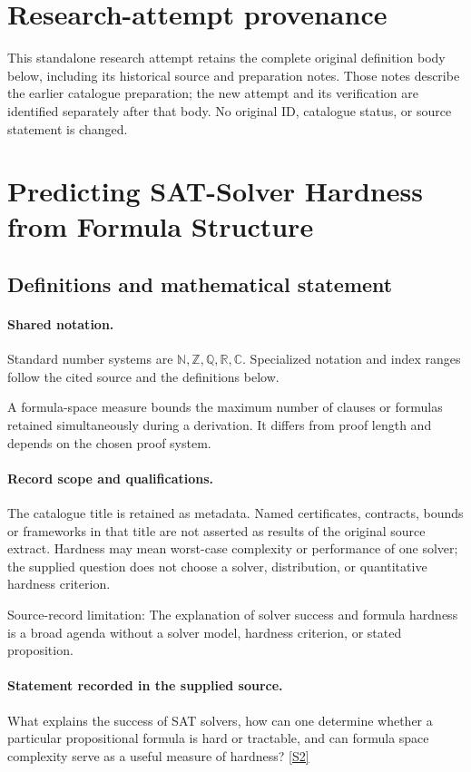 \documentclass[11pt]{article}
\begin{document}
\section*{Research-attempt provenance}
This standalone research attempt retains the complete original definition body below,
including its historical source and preparation notes. Those notes describe the
earlier catalogue preparation; the new attempt and its verification are identified
separately after that body. No original ID, catalogue status, or source statement is changed.

\section{Predicting SAT-Solver Hardness from Formula Structure}\label{statement}

\subsection{Definitions and mathematical statement}

\paragraph{Shared notation.}Standard number systems are $\mathbb N,\mathbb Z,\mathbb Q,\mathbb R,\mathbb C$. Specialized notation and index ranges follow the cited source and the definitions below.


A formula-space measure bounds the maximum number of clauses or formulas retained simultaneously during a derivation. It differs from proof length and depends on the chosen proof system.
\paragraph{Record scope and qualifications.}
The catalogue title is retained as metadata. Named certificates, contracts, bounds or frameworks in that title are not asserted as results of the original source extract.
Hardness may mean worst-case complexity or performance of one solver; the supplied question does not choose a solver, distribution, or quantitative hardness criterion.

Source-record limitation: The explanation of solver success and formula hardness is a broad agenda without a solver model, hardness criterion, or stated proposition.
\paragraph{Statement recorded in the supplied source.}
What explains the success of SAT solvers, how can one determine whether a particular propositional formula is hard or tractable, and can formula space complexity serve as a useful measure of hardness? \href{https://doi.org/10.4171/owr/2011/52}{[S2]}
\end{document}
